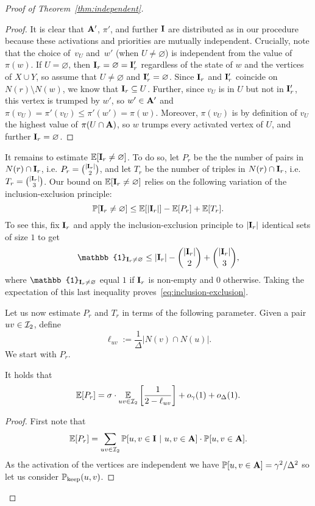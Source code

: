 \begin{proof}[Proof of Theorem~\ref{thm:independent}]
\begin{proof}
It is clear that ${\bf{A}}'$, $\pi'$, and further ${\bf{I}}$ are distributed as in our procedure
because these activations and priorities are mutually independent.
Crucially, note that the choice of~$v_U$ and~$w'$ (when $U\neq\varnothing$)
is independent from the value of $\pi(w)$.
If $U=\varnothing$, then ${\bf{I}}_r=\varnothing={\bf{I}}_r'$ regardless of
the state of $w$ and the vertices of $X\cup Y$,
so assume that $U\neq\varnothing$ and ${\bf{I}}_r'=\varnothing$.
Since ${\bf{I}}_r$ and ${\bf{I}}_r'$ coincide on $N(r)\setminus N(w)$,
we know that ${\bf{I}}_r\subseteq U$.
Further, since $v_U$ is in $U$ but not in ${\bf{I}}_r'$, this vertex is trumped by $w'$,
so $w'\in{\bf{A}}'$ and $\pi(v_U)=\pi'(v_U)\le\pi'(w')=\pi(w)$. 
Moreover, $\pi(v_U)$ is by definition of $v_U$ the highest value of $\pi(U\cap{\bf{A}})$,
so $w$ trumps every activated vertex of $U$, and further ${\bf{I}}_r=\varnothing$.
\end{proof}

It remains to estimate $\mathbb{E}[{\bf{I}}_r\neq\varnothing]$.
To do so, let $P_r$ be the the number of pairs
in $N(r)\cap {\bf{I}}_r$, i.e. $P_r=\binom{|{\bf{I}}_r|}{2}$, and let $T_r$ be the number of triples
in $N(r)\cap {\bf{I}}_r$, i.e. $T_r=\binom{|{\bf{I}}_r|}{3}$.
Our bound on $\mathbb{E}[{\bf{I}}_r\neq\varnothing]$ relies on the following variation
of the inclusion-exclusion principle:
\begin{equation}\label{eq:inclusion-exclusion} 
\mathbb{P}[{\bf{I}}_r \neq \varnothing] \leq \mathbb{E}[|{\bf{I}}_r|] - \mathbb{E}[P_r] + \mathbb{E}[T_r].
\end{equation}
To see this, fix ${\bf{I}}_r$ and
apply the inclusion-exclusion principle to $|{\bf{I}}_r|$ identical sets of size $1$
to get 
\[\mathbb{1}_{\bI_r \neq \varnothing}\leq |\bI_r| - \binom{|\bI_r|}{2} + \binom{|\bI_r|}{3},\]
where $\mathbb{1}_{\bI_r \neq \varnothing}$ equal $1$ if ${\bf{I}}_r$ is non-empty and $0$ otherwise.
Taking the expectation of this last inequality proves~\eqref{eq:inclusion-exclusion}.

Let us now estimate $P_r$ and $T_r$ in terms of the following parameter.
Given a pair $uv\in {\mathcal{I}}_2$,
define 
\[\ell_{uv}:=\frac{1}{\Delta}|N(v) \cap N(u)|.\]
We start with $P_r$.
\begin{claim}\label{claim:pairs}
It holds that
\[
  \mathbb{E}[P_r] = \sigma\cdot\underset{uv\in {\mathcal{I}}_2}{\mathbb{E}}\left[\frac{1}{2-\ell_{uv}}\right]
  + o_\gamma(1)
  + o_\Delta(1).
\]
\end{claim}
\begin{proof}
First note that
\[
   \mathbb{E}[P_r]= \sum_{uv\in {\mathcal{I}}_2}\mathbb{P}[u, v \in {\bf{I}}~|~u,v\in {\bf{A}}]\cdot\mathbb{P}[u, v \in {\bf{A}}].
\]
As the activation of the vertices are independent we have
$\mathbb{P}[u, v\in {\bf{A}}]=\gamma^2/\Delta^2$
so let us consider $\mathbb{P}_{\text{keep}}(u,v)$.


\end{proof}
\end{proof}
